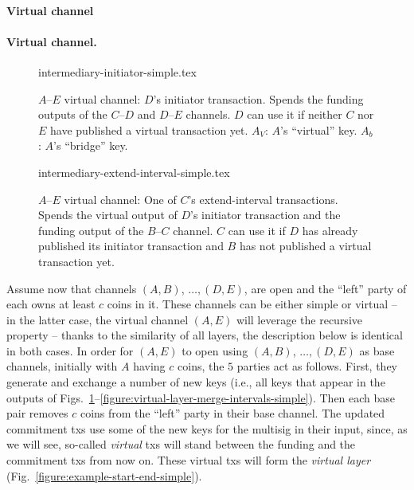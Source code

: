   \makeatletter%
    {\paragraph{Virtual channel}}%
    {\paragraph{Virtual channel.}}%
  \makeatother%
%
  \begin{figure}[!htbp]
%
    {intermediary-initiator-simple.tex}
    \caption{$A$--$E$ virtual channel: $D$'s initiator transaction. Spends the
    funding outputs of the $C$--$D$ and $D$--$E$ channels. $D$ can use it if neither
    $C$ nor $E$ have published a virtual transaction yet. $A_V$: $A$'s
    ``virtual'' key. $A_b$: $A$'s ``bridge'' key.}
    \label{figure:virtual-layer-initiator-simple}
  \end{figure}
%
%
  \begin{figure}[!htbp]
%
    {intermediary-extend-interval-simple.tex}
    \caption{$A$--$E$ virtual channel: One of $C$'s extend-interval
    transactions. Spends the virtual output of $D$'s
    initiator transaction and the funding output of the $B$--$C$ channel. $C$ can
    use it if $D$ has already published its initiator transaction and $B$ has
    not published a virtual transaction yet.}
    \label{figure:virtual-layer-extend-interval-simple}
  \end{figure}
%

  Assume now that channels $(A, B)$, $\dots,(D, E)$, are open and the ``left''
  party of each owns at least $c$ coins in it. These channels can be either
  simple or virtual -- in the latter case, the virtual channel $(A, E)$ will
  leverage the recursive property --
  thanks to the similarity of all layers, the description below is identical in
  both cases. In order for $(A, E)$ to open using $(A, B)$,
  $\dots,(D, E)$ as base channels, initially with $A$ having $c$ coins, the
  $5$ parties act as follows. First, they generate and exchange a number of new
  keys (i.e., all keys that appear in the outputs of
  Figs.~\ref{figure:virtual-layer-initiator-simple}--\ref{figure:virtual-layer-merge-intervals-simple}). Then
  each base pair removes $c$ coins from the ``left'' party in
  their base channel. The updated commitment txs use some of the new
  keys for the multisig in their input, since, as we will see, so-called \emph{virtual}
  txs will stand between the funding and the commitment txs from now on. These
  virtual txs will form the \emph{virtual layer} (Fig.~\ref{figure:example-start-end-simple}).

